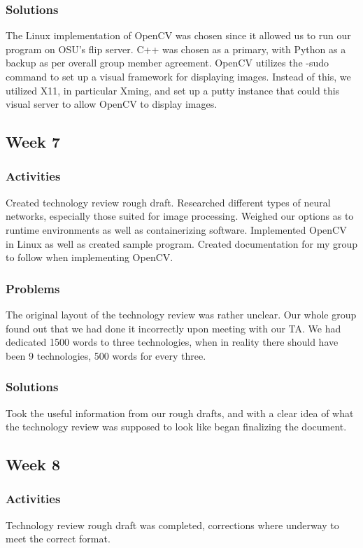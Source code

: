 \documentclass[onecolumn, draftclsnofoot,10pt, compsoc]{IEEEtran}
\begin{document}
\subsubsection{Solutions}
The Linux implementation of OpenCV was chosen since it allowed us to run our program on OSU’s flip server. C++ was chosen as a primary, with Python as a backup as per overall group member agreement. OpenCV utilizes the -sudo command to set up a visual framework for displaying images. Instead of this, we utilized X11, in particular Xming, and set up a putty instance that could this visual server to allow OpenCV to display images.

\subsection{Week 7}
\subsubsection{Activities}
Created technology review rough draft. Researched different types of neural networks, especially those suited for image processing. Weighed our options as to runtime environments as well as containerizing software. Implemented OpenCV in Linux as well as created sample program. Created documentation for my group to follow when implementing OpenCV.

\subsubsection{Problems}
The original layout of the technology review was rather unclear. Our whole group found out that we had done it incorrectly upon meeting with our TA. We had dedicated 1500 words to three technologies, when in reality there should have been 9 technologies, 500 words for every three.

\subsubsection{Solutions}
Took the useful information from our rough drafts, and with a clear idea of what the technology review was supposed to look like began finalizing the document.

\subsection{Week 8}
\subsubsection{Activities}
Technology review rough draft was completed, corrections where underway to meet the correct format.
\end{document}
